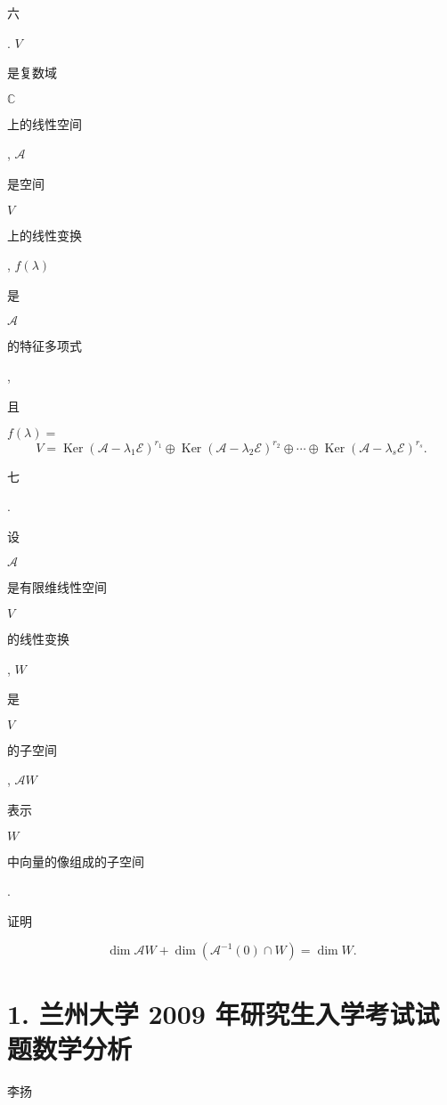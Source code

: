 \documentclass[10pt]{article}
\begin{document}
\begin{CJK}{UTF8}{mj}六\end{CJK}. $V$ \begin{CJK}{UTF8}{mj}是复数域\end{CJK} $\mathbb{C}$ \begin{CJK}{UTF8}{mj}上的线性空间\end{CJK}, $\mathscr{A}$ \begin{CJK}{UTF8}{mj}是空间\end{CJK} $V$ \begin{CJK}{UTF8}{mj}上的线性变换\end{CJK}, $f(\lambda)$ \begin{CJK}{UTF8}{mj}是\end{CJK} $\mathscr{A}$ \begin{CJK}{UTF8}{mj}的特征多项式\end{CJK}, \begin{CJK}{UTF8}{mj}且\end{CJK} $f(\lambda)=$
$$
V=\operatorname{Ker}\left(\mathscr{A}-\lambda_{1} \mathscr{E}\right)^{r_{1}} \oplus \operatorname{Ker}\left(\mathscr{A}-\lambda_{2} \mathscr{E}\right)^{r_{2}} \oplus \cdots \oplus \operatorname{Ker}\left(\mathscr{A}-\lambda_{s} \mathscr{E}\right)^{r_{s}} .
$$
\begin{CJK}{UTF8}{mj}七\end{CJK}. \begin{CJK}{UTF8}{mj}设\end{CJK} $\mathscr{A}$ \begin{CJK}{UTF8}{mj}是有限维线性空间\end{CJK} $V$ \begin{CJK}{UTF8}{mj}的线性变换\end{CJK}, $W$ \begin{CJK}{UTF8}{mj}是\end{CJK} $V$ \begin{CJK}{UTF8}{mj}的子空间\end{CJK}, $\mathscr{A} W$ \begin{CJK}{UTF8}{mj}表示\end{CJK} $W$ \begin{CJK}{UTF8}{mj}中向量的像组成的子空间\end{CJK}. \begin{CJK}{UTF8}{mj}证明\end{CJK}
$$
\operatorname{dim} \mathscr{A} W+\operatorname{dim}\left(\mathscr{A}^{-1}(0) \cap W\right)=\operatorname{dim} W .
$$

\section{1. 兰州大学 2009 年研究生入学考试试题数学分析}
\begin{CJK}{UTF8}{mj}李扬\end{CJK}
\end{document}
